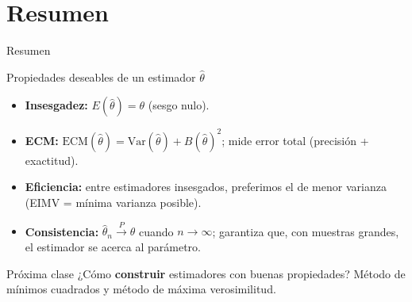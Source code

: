 \documentclass[aspectratio=169,11pt]{beamer}
\begin{document}
\section{Resumen}

\begin{frame}{Resumen}
\begin{block}{Propiedades deseables de un estimador $\widehat\theta$}
\begin{itemize}
\item \textbf{Insesgadez:} $E(\widehat\theta)=\theta$ (sesgo nulo).
\item \textbf{ECM:} $\mathrm{ECM}(\widehat\theta)=\mathrm{Var}(\widehat\theta)+B(\widehat\theta)^2$; mide error total (precisión + exactitud).
\item \textbf{Eficiencia:} entre estimadores insesgados, preferimos el de menor varianza (EIMV = mínima varianza posible).
\item \textbf{Consistencia:} $\widehat\theta_n \xrightarrow{P} \theta$ cuando $n\to\infty$; garantiza que, con muestras grandes, el estimador se acerca al parámetro.
\end{itemize}
\end{block}

\begin{alertblock}{Próxima clase}
¿Cómo \textbf{construir} estimadores con buenas propiedades? Método de mínimos cuadrados y método de máxima verosimilitud.
\end{alertblock}
\end{frame}
\end{document}
